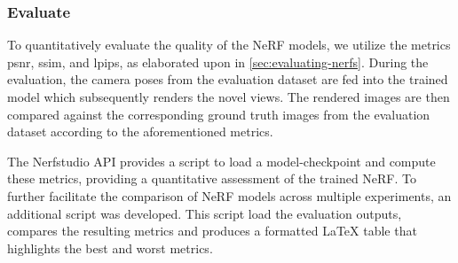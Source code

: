 \begin{comment}
During the training of a NeRF, a batch of pixels is created for each training iteration. By default, this batch consists of 4096 pixels. To obtain these pixels, the training algorithm randomly samples them from all of the training images that are stored in RAM. However, this approach can be memory-intensive, especially when dealing with large datasets. To address this issue, the NeRF pipeline provides an option to set the parameter \texttt{–-pipeline.datamanager.train-num-images-to-sample-from}, which allows the user to sample pixels from a smaller subset of images. When using a smaller subset of images, the training algorithm will keep sampling from this subset unless the parameter \texttt{--num-times-to-repeat-images} is also set. This parameter specifies the number of training iterations after which the training algorithm should grab a new set of images to sample from. For instance, if \texttt{--num-times-to-repeat-images} is set to 1, the training algorithm will grab a new set of images to sample from every iteration. However, this approach can be computationally expensive and slow down the training process.
\end{comment}




\subsubsection{Evaluate}
To quantitatively evaluate the quality of the NeRF models, we utilize the metrics \acrshort{psnr}, \acrshort{ssim}, and \acrshort{lpips}, as elaborated upon in \autoref{sec:evaluating-nerfs}. During the evaluation, the camera poses from the evaluation dataset are fed into the trained model which subsequently renders the novel views. The rendered images are then compared against the corresponding ground truth images from the evaluation dataset according to the aforementioned metrics. 

The Nerfstudio API provides a script to load a model-checkpoint and compute these metrics, providing a quantitative assessment of the trained NeRF. To further facilitate the comparison of NeRF models across multiple experiments, an additional script was developed. This script load the evaluation outputs, compares the resulting metrics and produces a formatted LaTeX table that highlights the best and worst metrics.

%

